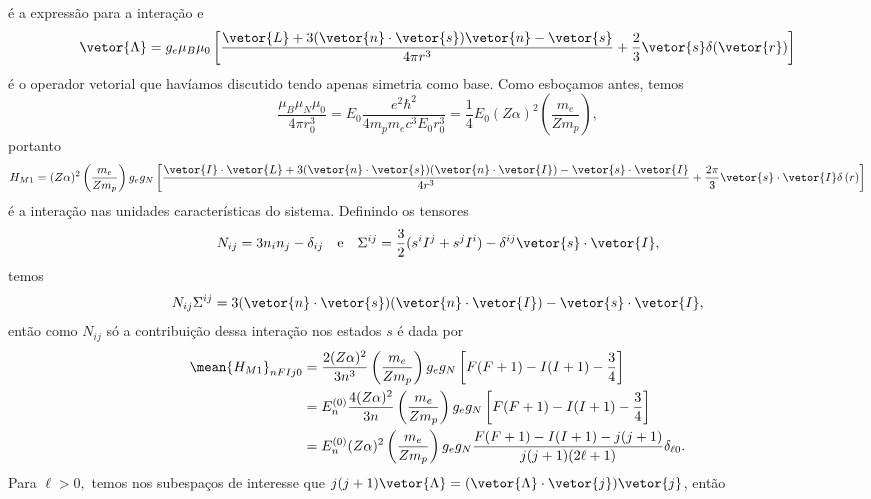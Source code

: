 é a expressão para a interação e 
\begin{equation*}
   \vetor{\Lambda} = g_e \mu_B \mu_0 \left[\frac{\vetor{L} + 3(\vetor{n}\cdot \vetor{s})\vetor{n} - \vetor{s}}{4\pi r^3} + \frac23 \vetor{s} \delta(\vetor{r})\right]
\end{equation*}
é o operador vetorial que havíamos discutido tendo apenas simetria como base. Como esboçamos antes, temos
\begin{equation*}
   \frac{\mu_B \mu_N\mu_0}{4\pi r_0^3} = E_0\frac{e^2 \hbar^2}{4m_p m_e c^3 E_0r_0^3} = \frac14 E_0(Z \alpha)^2\left(\frac{m_e}{Zm_p}\right),
\end{equation*}
portanto
\begin{equation*}
   H_{M1} = (Z\alpha)^2 \left(\frac{m_e}{Z m_p}\right)g_e g_N\left[\frac{\vetor{I} \cdot \vetor{L} + 3 (\vetor{n}\cdot\vetor{s})(\vetor{n} \cdot \vetor{I}) - \vetor{s} \cdot \vetor{I}}{4r^3} + \frac{2\pi}3 \vetor{s} \cdot \vetor{I} \delta\left(r\right)\right]
\end{equation*}
é a interação nas unidades características do sistema. Definindo os tensores
\begin{equation*}
   N_{ij} = 3 n_i n_j - \delta_{ij}
   \quad\text{e}\quad
   \Sigma^{ij} = \frac32 (s^i I^j + s^j I^i) - \delta^{ij} \vetor{s} \cdot \vetor{I},
\end{equation*}
temos
\begin{equation*}
   N_{ij} \Sigma^{ij} = 3 (\vetor{n} \cdot \vetor{s}) (\vetor{n} \cdot \vetor{I}) - \vetor{s} \cdot \vetor{I},
\end{equation*}
então como \(N_{ij}\) só  a contribuição dessa interação nos estados \(s\) é dada por
\begin{align*}
   \mean{H_{M1}}_{nFI j 0} &= \frac{2(Z \alpha)^2}{3n^3}  \left(\frac{m_e}{Z m_p}\right) g_e g_N \left[F(F+1) - I(I+1) -\frac34\right]\\
                           &= E^{(0)}_n\frac{4 (Z \alpha)^2}{3n}\left(\frac{m_e}{Z m_p}\right) g_e g_N \left[F(F + 1) - I(I + 1) - \frac34\right]\\
                           &= E^{(0)}_n(Z \alpha)^2\left(\frac{m_e}{Z m_p}\right) g_e g_N\frac{F(F + 1) - I(I + 1) - j(j+1)}{j(j+1)(2\ell + 1)}\delta_{\ell 0}.
\end{align*}
Para \(\ell > 0,\) temos nos subespaços de interesse que \(j(j+1)\vetor{\Lambda} = (\vetor{\Lambda} \cdot \vetor{j})\vetor{j}\), então
